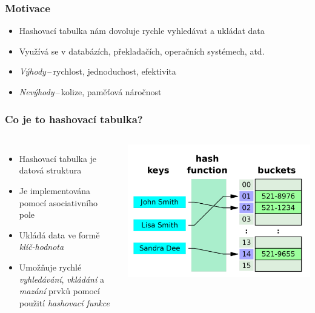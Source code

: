 \documentclass[]{fitthesispresn}
\begin{document}
    \frame[plain]{\titlepage} %

    \begin{frame}
        \frametitle{Motivace}
        \begin{itemize}
            \item Hashovací tabulka nám dovoluje rychle vyhledávat a ukládat data
            \item Využívá se v databázích, překladačích, operačních systémech, atd.
            \item \emph{Výhody}\,--\,rychlost, jednoduchost, efektivita
            \item \emph{Nevýhody}\,--\,kolize, paměťová náročnost
        \end{itemize}
    \end{frame}

    \begin{frame}
        \frametitle{Co je to hashovací tabulka?}
        \begin{columns}
            \begin{itemize}
                \item Hashovací tabulka je datová struktura
                \item Je implementována pomocí asociativního pole
                \item Ukládá data ve formě \emph{klíč-hodnota}
                \item Umožňuje rychlé \emph{vyhledávání}, \emph{vkládání} a \emph{mazání} prvků pomocí použití \emph{hashovací funkce}
            \end{itemize}
            \includegraphics[width=\textwidth]{img/hash_table.pdf} %
        \end{columns}
    \end{frame}
\end{document}
